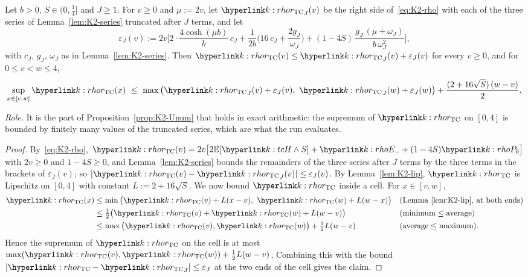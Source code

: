 \documentclass[11pt]{article}
\newcommand{\E}{\mathbb{E}}
\newcommand{\1}{\mathbf{1}}
\begin{document}
\begin{lemma}\label{lem:K2-cell}
Let $b>0$, $S\in(0,\frac14]$ and $J\ge1$. For $v\ge0$ and $\mu:=2v$, let $\kr_J(v)$ be the right side of~\eqref{eq:K2-rho} with each of the three series of
Lemma~\ref{lem:K2-series} truncated after $J$ terms, and let
\[
\varepsilon_J(v):=2v\Big[2\cdot\frac{4\cosh(\mu b)}{b}\,c_J+\frac1{2b}\Big(16\,c_J+\frac{2g_J}{\omega_J}\Big)+(1-4S)\,\frac{g_J\,(\mu+\omega_J)}{b\,\omega_J^2}\Big],
\]
with $c_J$, $g_J$, $\omega_J$ as in Lemma~\ref{lem:K2-series}. Then $\kr(v)\le\kr_J(v)+\varepsilon_J(v)$ for every $v\ge0$, and for $0\le v<w\le4$,
\[
\sup_{x\in[v,w]}\kr(x)\ \le\ \max\big(\kr_J(v)+\varepsilon_J(v),\ \kr_J(w)+\varepsilon_J(w)\big)+\frac{(2+16\sqrt S)\,(w-v)}2 .
\]
\end{lemma}
\noindent\textit{Role.} It is the part of Proposition~\ref{prop:K2-Unum} that holds in exact arithmetic: the supremum of $\kr$ on $[0,4]$ is bounded by finitely many
values of the truncated series, which are what the run evaluates.
\begin{proof}
By~\eqref{eq:K2-rho}, $\kr(v)=2v\big[2\E[\kH\wedge S]+\kEm+(1-4S)\kPo\big]$ with $2v\ge0$ and $1-4S\ge0$, and Lemma~\ref{lem:K2-series} bounds the remainders of the
three series after $J$ terms by the three terms in the brackets of $\varepsilon_J(v)$; so $|\kr(v)-\kr_J(v)|\le\varepsilon_J(v)$. By Lemma~\ref{lem:K2-lip}, $\kr$ is
Lipschitz on $[0,4]$ with constant $L:=2+16\sqrt S$. We now bound $\kr$ inside a cell. For $x\in[v,w]$,
\begin{align*}
\kr(x)&\le\min\big(\kr(v)+L(x-v),\ \kr(w)+L(w-x)\big) &&\text{(Lemma~\ref{lem:K2-lip}, at both ends)}\\
&\le\tfrac12\big(\kr(v)+\kr(w)+L(w-v)\big) &&\text{(minimum}\le\text{average)}\\
&\le\max\big(\kr(v),\kr(w)\big)+\tfrac12L(w-v) &&\text{(average}\le\text{maximum)}.
\end{align*}
Hence the supremum of $\kr$ on the cell is at most $\max(\kr(v),\kr(w))+\frac12L(w-v)$. Combining this with the bound $|\kr-\kr_J|\le\varepsilon_J$ at the two
ends of the cell gives the claim.
\end{proof}
\end{document}
